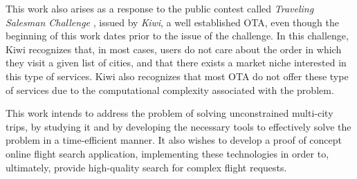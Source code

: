 This work also arises as a response to the public contest called \textit{Traveling Salesman Challenge} \cite{tsc_kiwi},
issued by \textit{Kiwi}, a well established OTA, even though the beginning of this work dates prior to the issue of the challenge.
In this challenge, Kiwi recognizes that, in most cases, users do not care about the order in which they visit 
a given list of cities, and that there exists a market niche interested in this type of services.
Kiwi also recognizes that most OTA do not offer these type of services due to the computational 
complexity associated with the problem.

This work intends to address the problem of solving unconstrained multi-city trips, by studying it and by developing 
the necessary tools to effectively solve the problem in a time-efficient manner.
It also wishes to develop a proof of concept online flight search application, 
implementing these technologies in order to, ultimately, provide high-quality search
for complex flight requests.


